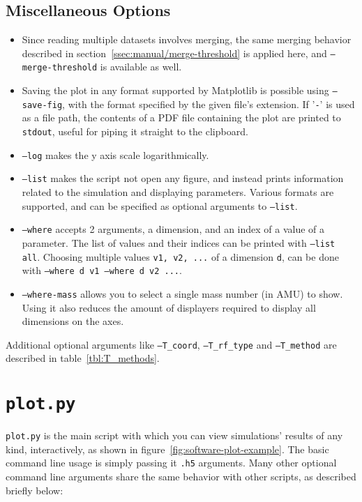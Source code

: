 \subsection{Miscellaneous Options}\label{ssec:manual/misc-options}

\begin{itemize}
	\item Since reading multiple datasets involves merging, the same merging behavior described in section~\ref{ssec:manual/merge-threshold} is applied here, and \texttt{--merge-threshold} is available as well.
	\item Saving the plot in any format supported by Matplotlib is possible using \texttt{--save-fig}, with the format specified by the given file's extension. If '\texttt{-}' is used as a file path, the contents of a PDF file containing the plot are printed to \texttt{stdout}, useful for piping it straight to the clipboard.
	\item \texttt{--log} makes the y axis scale logarithmically. 
	\item \texttt{--list} makes the script not open any figure, and instead prints information related to the simulation and displaying parameters. Various formats are supported, and can be specified as optional arguments to \texttt{--list}.
	\item \texttt{--where} accepts 2 arguments, a dimension, and an index of a value of a parameter. The list of values and their indices can be printed with \texttt{--list all}. Choosing multiple values \texttt{v1, v2, ...} of a dimension \texttt{d}, can be done with \texttt{--where d v1 --where d v2 ...}.
	\item \texttt{--where-mass} allows you to select a single mass number (in AMU) to show. Using it also reduces the amount of displayers required to display all dimensions on the axes.
\end{itemize}

Additional optional arguments like \texttt{--T\_coord}, \texttt{--T\_rf\_type} and \texttt{--T\_method} are described in table~\ref{tbl:T_methods}.

\section{\texttt{plot.py}}\label{sec:manual/plot}

\texttt{plot.py} is the main script with which you can view simulations' results of any kind, interactively, as shown in figure~\ref{fig:software-plot-example}. The basic command line usage is simply passing it \texttt{.h5} arguments. Many other optional command line arguments share the same behavior with other scripts, as described briefly below:

